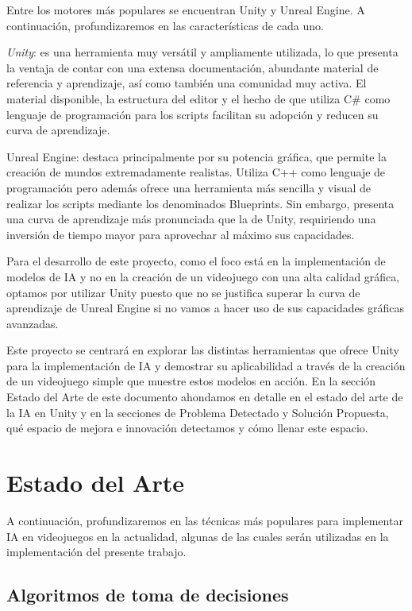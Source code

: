 \documentclass{article}
\begin{document}
Entre los motores más populares se encuentran Unity y Unreal Engine. A continuación, profundizaremos en las características de cada uno.

\textit{Unity}: es una herramienta muy versátil y ampliamente utilizada, lo que presenta la ventaja de contar con una extensa documentación, abundante material de referencia y aprendizaje, así como también una comunidad muy activa. El material disponible, la estructura del editor y el hecho de que utiliza C\# como lenguaje de programación para los scripts facilitan su adopción y reducen su curva de aprendizaje.

Unreal Engine: destaca principalmente por su potencia gráfica, que permite la creación de mundos extremadamente realistas. Utiliza C++ como lenguaje de programación pero además ofrece una herramienta más sencilla y visual de realizar los scripts mediante los denominados Blueprints.
Sin embargo, presenta una curva de aprendizaje más pronunciada que la de Unity, requiriendo una inversión de tiempo mayor para aprovechar al máximo sus capacidades.

Para el desarrollo de este proyecto, como el foco está en la implementación de modelos de IA y no en la creación de un videojuego con una alta calidad gráfica, optamos por utilizar Unity puesto que no se justifica superar la curva de aprendizaje de Unreal Engine si no vamos a hacer uso de sus capacidades gráficas avanzadas.

Este proyecto se centrará en explorar las distintas herramientas que ofrece Unity para la implementación de IA y demostrar su aplicabilidad a través de la creación de un videojuego simple que muestre estos modelos en acción. En la sección Estado del Arte de este documento ahondamos en detalle en el estado del arte de la IA en Unity y en la secciones de Problema Detectado y Solución Propuesta, qué espacio de mejora e innovación detectamos y cómo llenar este espacio.

\section{Estado del Arte}
A continuación, profundizaremos en las técnicas más populares para implementar IA en videojuegos en la actualidad, algunas de las cuales serán utilizadas en la implementación del presente trabajo.

\subsection{Algoritmos de toma de decisiones}
\end{document}
